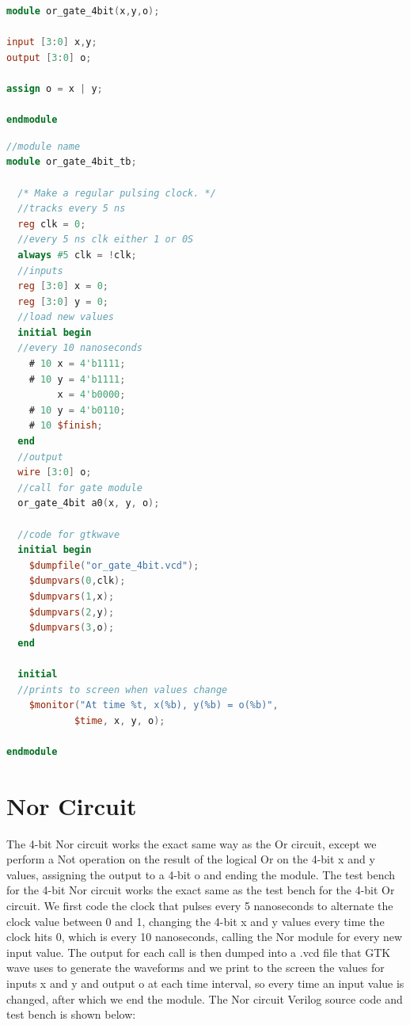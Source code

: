 \documentclass[runningheads, 12pt]{report}
\begin{document}
\begin{lstlisting}[language=Verilog, caption={Or Circuit Verilog}]
module or_gate_4bit(x,y,o);

input [3:0] x,y;
output [3:0] o;

assign o = x | y;

endmodule
\end{lstlisting}

\begin{lstlisting}[language=Verilog, caption={Or Circuit Test Bench}]
//module name
module or_gate_4bit_tb;			

  /* Make a regular pulsing clock. */	
  //tracks every 5 ns
  reg clk = 0;
  //every 5 ns clk either 1 or 0S
  always #5 clk = !clk;			
  //inputs
  reg [3:0] x = 0;			
  reg [3:0] y = 0;
  //load new values
  initial begin		
  //every 10 nanoseconds
    # 10 x = 4'b1111;	
    # 10 y = 4'b1111;
    	 x = 4'b0000;
    # 10 y = 4'b0110;
    # 10 $finish;
  end
  //output
  wire [3:0] o;	
  //call for gate module
  or_gate_4bit a0(x, y, o);	
  
  //code for gtkwave
  initial begin	
    $dumpfile("or_gate_4bit.vcd");
    $dumpvars(0,clk);
    $dumpvars(1,x);
    $dumpvars(2,y);
    $dumpvars(3,o);
  end
  
  initial 	
  //prints to screen when values change
    $monitor("At time %t, x(%b), y(%b) = o(%b)",  
    		$time, x, y, o);   
    									
endmodule 
\end{lstlisting}

	\section{Nor Circuit}
	
	The 4-bit Nor circuit works the exact same way as the Or circuit, except we perform a Not operation on the result of the logical Or on the 4-bit x and y values, assigning the output to a 4-bit o and ending the module. The test bench for the 4-bit Nor circuit works the exact same as the test bench for the 4-bit Or circuit. We first code the clock that pulses every 5 nanoseconds to alternate the clock value between 0 and 1, changing the 4-bit x and y values every time the clock hits 0, which is every 10 nanoseconds, calling the Nor module for every new input value. The output for each call is then dumped into a .vcd file that GTK wave uses to generate the waveforms and we print to the screen the values for inputs x and y and output o at each time interval, so every time an input value is changed, after which we end the module. The Nor circuit Verilog source code and test bench is shown below:
	
\end{document}
